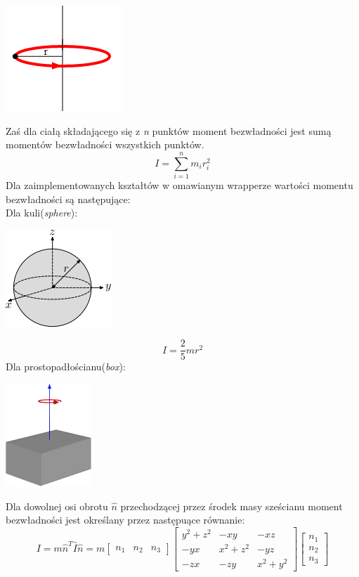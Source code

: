 \begin{center}
\includegraphics{./img/inertia.png}
\end{center}

Zaś dla ciałą składającego się z \emph{n} punktów moment bezwładności jest sumą
momentów bezwładności wszystkich punktów.
\begin{equation}
I = \sum_{i=1}^{n} m_{i}r_{i}^{2}
\end{equation}
Dla zaimplementowanych kształtów w omawianym wrapperze wartości momentu
bezwładności są następujące:\\
Dla kuli(\emph{sphere}):\\
\begin{center}
\includegraphics{./img/inertiaSphere.png}
\end{center}
\begin{equation}
I = \frac{2}{5}mr^{2}
\end{equation}
Dla prostopadłościanu(\emph{box}):\\
\begin{center}
\includegraphics{./img/inertiaBox.png}
\end{center}
Dla dowolnej osi obrotu $ \hat{n} $ przechodzącej przez środek masy sześcianu
moment bezwładności jest określany przez następuące równanie:
\begin{equation}
I = m\hat{n}^{T}\hat{I}\hat{n} = m
\begin{bmatrix}n_{1}&n_{2}&n_{3}\end{bmatrix}
\begin{bmatrix}y^{2}+z^{2}&-xy&-xz\\-yx&x^{2}+z^{2}&-yz\\-zx&-zy&x^{2}+y^{2}\end{bmatrix}
\begin{bmatrix}n_{1}\\n_{2}\\n_{3}\end{bmatrix}
\label{eq:boxInertia}
\end{equation}
